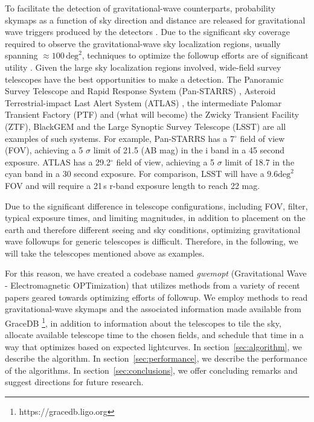 \documentclass[twocolumn]{aastex61}
\begin{document}
To facilitate the detection of gravitational-wave counterparts, probability skymaps as a function of sky direction and distance are released for gravitational wave triggers produced by the detectors \citep{SiPr2014,BeMa2015}. 
Due to the significant sky coverage required to observe the gravitational-wave sky localization regions, usually spanning $\approx 100\,\textrm{deg}^2$, techniques to optimize the followup efforts are of significant utility \citep{Fair2009,Fair2011,Grover:2013,WeCh2010,SiAy2014,SiPr2014,BeMa2015,EsVi2015,CoLi2015,KlVe2016}.
Given the large sky localization regions involved, wide-field survey telescopes have the best opportunities to make a detection. 
The Panoramic Survey Telescope and Rapid Response System (Pan-STARRS) \citep{MoKa2012}, Asteroid Terrestrial-impact Last Alert System (ATLAS) \citep{Ton2011}, the intermediate Palomar Transient Factory (PTF) \citep{RaSh2009} and (what will become) the Zwicky Transient Facility (ZTF), BlackGEM \citep{BlGr2015} and the Large Synoptic Survey Telescope (LSST) \citep{Ivezic2014} are all examples of such systems.
For example, Pan-STARRS has a 7$^\circ$ field of view (FOV), achieving a 5 $\sigma$ limit of 21.5 (AB mag) in the i band in a 45 second exposure. ATLAS has a 29.2$^\circ$ field of view, achieving a 5 $\sigma$ limit of 18.7 in the cyan band in a 30 second exposure. For comparison, LSST will have a $9.6\textrm{deg}^2$ FOV and will require a 21\,s r-band exposure length to reach 22 mag.

Due to the significant difference in telescope configurations, including FOV, filter, typical exposure times, and limiting magnitudes, in addition to placement on the earth and therefore different seeing and sky conditions, optimizing gravitational wave followups for generic telescopes is difficult. Therefore, in the following, we will take the telescopes mentioned above as examples. 

For this reason, we have created a codebase named \emph{gwemopt} (Gravitational Wave - Electromagnetic OPTimization) that utilizes methods from a variety of recent papers geared towards optimizing efforts of followup. We employ methods to read gravitational-wave skymaps and the associated information made available from GraceDB \footnote{https://gracedb.ligo.org}, in addition to information about the telescopes to tile the sky, allocate available telescope time to the chosen fields, and schedule that time in a way that optimizes based on expected lightcurves.
In section~\ref{sec:algorithm}, we describe the algorithm.
In section~\ref{sec:performance}, we describe the performance of the algorithms.
In section~\ref{sec:conclusions}, we offer concluding remarks and suggest directions for future research.
\end{document}
